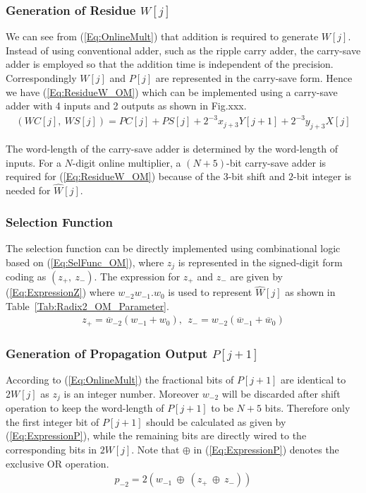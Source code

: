 \documentclass[a4paper, 11pt]{article}
\begin{document}
\subsubsection{Generation of Residue $W[j]$}
We can see from (\ref{Eq:OnlineMult}) that addition is required to generate $W[j]$. Instead of using conventional adder, such as the ripple carry adder, the carry-save adder is employed so that the addition time is independent of the precision. Correspondingly $W[j]$ and $P[j]$ are represented in the carry-save form. Hence we have (\ref{Eq:ResidueW_OM}) which can be implemented using a carry-save adder with 4 inputs and 2 outputs as shown in Fig.xxx.
\begin{eqnarray}\label{Eq:ResidueW_OM}
  (WC[j],~WS[j]) = PC[j] + PS[j] + 2^{-3}x_{j+3}Y[j+1] + 2^{-3}y_{j+3}X[j]
\end{eqnarray}

The word-length of the carry-save adder is determined by the word-length of inputs. For a $N$-digit online multiplier, a $(N+5)$-bit carry-save adder is required for (\ref{Eq:ResidueW_OM}) because of the $3$-bit shift and $2$-bit integer is needed for $\widehat{W}[j]$.

\subsubsection{Selection Function}
The selection function can be directly implemented using combinational logic based on (\ref{Eq:SelFunc_OM}), where $z_j$ is represented in the signed-digit form coding as $(z_+,~z_-)$. The expression for $z_+$ and $z_-$ are given by (\ref{Eq:ExpressionZ}) where $w_{-2}w_{-1}.w_0$ is used to represent $\widehat{W}[j]$ as shown in Table~\ref{Tab:Radix2_OM_Parameter}.
%
\begin{eqnarray}\label{Eq:ExpressionZ}
  z_+=\overline{w}_{-2}(w_{-1}+w_0),~~z_-=w_{-2}(\overline{w}_{-1}+\overline{w}_0)
\end{eqnarray}

\subsubsection{Generation of Propagation Output $P[j+1]$}
According to (\ref{Eq:OnlineMult}) the fractional bits of $P[j+1]$ are identical to $2W[j]$ as $z_j$ is an integer number. Moreover $w_{-2}$ will be discarded after shift operation to keep the word-length of $P[j+1]$ to be $N+5$ bits. Therefore only the first integer bit of $P[j+1]$ should be calculated as given by (\ref{Eq:ExpressionP}), while the remaining bits are directly wired to the corresponding bits in $2W[j]$. Note that $\oplus$ in (\ref{Eq:ExpressionP}) denotes the exclusive OR operation.
%
\begin{eqnarray}\label{Eq:ExpressionP}
  p_{-2} = 2(w_{-1} ~\oplus~ (z_+ ~\oplus~ z_-))
\end{eqnarray}
\end{document}

